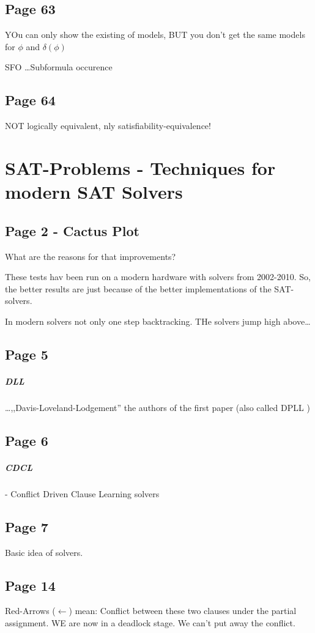\documentclass[a4paper]{article}
\begin{document}
\subsection{Page 63}
YOu can only show the existing of models, BUT you don't get the same models for 
$\phi$ and $\delta(\phi)$

SFO \ldots Subformula occurence

\subsection{Page 64}

NOT logically equivalent, nly satisfiability-equivalence!








\section{SAT-Problems - Techniques for modern SAT Solvers}

\subsection{Page 2 - Cactus Plot}
What are the reasons for that improvements?

These tests hav been run on a modern hardware with solvers from 2002-2010. So,
the better results are just because of the better implementations of the
SAT-solvers.

In modern solvers not only one step backtracking. THe solvers jump high above\ldots

\subsection{Page 5}
\subparagraph{DLL} \ldots ,,Davis-Loveland-Lodgement'' the authors of the first
paper (also called DPLL )

\subsection{Page 6}
\subparagraph{CDCL} - Conflict Driven Clause Learning solvers

\subsection{Page 7}
Basic idea of solvers.

\subsection{Page 14}
Red-Arrows ($\leftarrow$) mean: Conflict between these two clauses under the
partial assignment. WE are now in a deadlock stage. We can't put away the
conflict.
\end{document}
